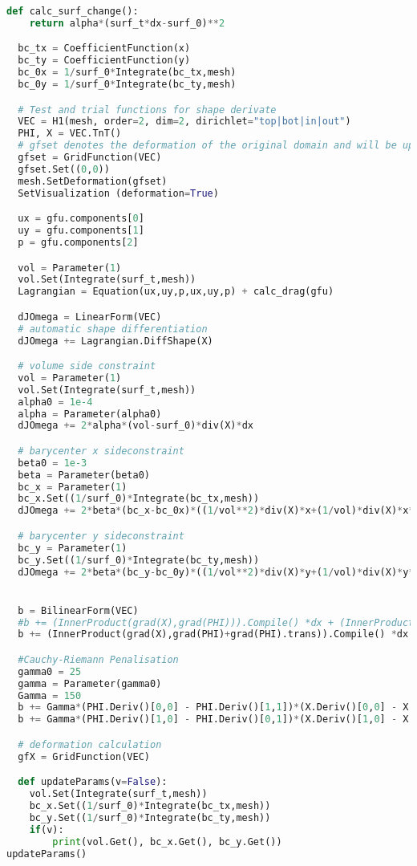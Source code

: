 \begin{appendix}
\begin{lstlisting}[language=Python, title=NGSolve Shape Optimization Code in Python, label=final_code]
  def calc_surf_change():
    return alpha*(surf_t*dx-surf_0)**2

  bc_tx = CoefficientFunction(x)
  bc_ty = CoefficientFunction(y)
  bc_0x = 1/surf_0*Integrate(bc_tx,mesh)
  bc_0y = 1/surf_0*Integrate(bc_ty,mesh)

  # Test and trial functions for shape derivate
  VEC = H1(mesh, order=2, dim=2, dirichlet="top|bot|in|out")
  PHI, X = VEC.TnT()
  # gfset denotes the deformation of the original domain and will be updated during the shape optimization
  gfset = GridFunction(VEC)
  gfset.Set((0,0))
  mesh.SetDeformation(gfset)
  SetVisualization (deformation=True)

  ux = gfu.components[0]
  uy = gfu.components[1]
  p = gfu.components[2]

  vol = Parameter(1)
  vol.Set(Integrate(surf_t,mesh))
  Lagrangian = Equation(ux,uy,p,ux,uy,p) + calc_drag(gfu) 

  dJOmega = LinearForm(VEC)
  # automatic shape differentiation
  dJOmega += Lagrangian.DiffShape(X)

  # volume side constraint
  vol = Parameter(1)
  vol.Set(Integrate(surf_t,mesh))
  alpha0 = 1e-4
  alpha = Parameter(alpha0)
  dJOmega += 2*alpha*(vol-surf_0)*div(X)*dx

  # barycenter x sideconstraint
  beta0 = 1e-3
  beta = Parameter(beta0)
  bc_x = Parameter(1)
  bc_x.Set((1/surf_0)*Integrate(bc_tx,mesh))
  dJOmega += 2*beta*(bc_x-bc_0x)*((1/vol**2)*div(X)*x+(1/vol)*div(X)*x*sum(gfset.vecs[0].data)[0])*dx

  # barycenter y sideconstraint
  bc_y = Parameter(1)
  bc_y.Set((1/surf_0)*Integrate(bc_ty,mesh))
  dJOmega += 2*beta*(bc_y-bc_0y)*((1/vol**2)*div(X)*y+(1/vol)*div(X)*y*sum(gfset.vecs[0].data)[1])*dx


  b = BilinearForm(VEC)
  #b += (InnerProduct(grad(X),grad(PHI))).Compile() *dx + (InnerProduct(X,PHI)).Compile()*dx
  b += (InnerProduct(grad(X),grad(PHI)+grad(PHI).trans)).Compile() *dx + (InnerProduct(X,PHI)).Compile()*dx

  #Cauchy-Riemann Penalisation
  gamma0 = 25
  gamma = Parameter(gamma0)
  Gamma = 150
  b += Gamma*(PHI.Deriv()[0,0] - PHI.Deriv()[1,1])*(X.Deriv()[0,0] - X.Deriv()[1,1])*dx
  b += Gamma*(PHI.Deriv()[1,0] - PHI.Deriv()[0,1])*(X.Deriv()[1,0] - X.Deriv()[0,1])*dx

  # deformation calculation
  gfX = GridFunction(VEC)

  def updateParams(v=False):
    vol.Set(Integrate(surf_t,mesh))
    bc_x.Set((1/surf_0)*Integrate(bc_tx,mesh))
    bc_y.Set((1/surf_0)*Integrate(bc_ty,mesh))
    if(v):
        print(vol.Get(), bc_x.Get(), bc_y.Get())
updateParams()


\end{lstlisting}
\end{appendix}
